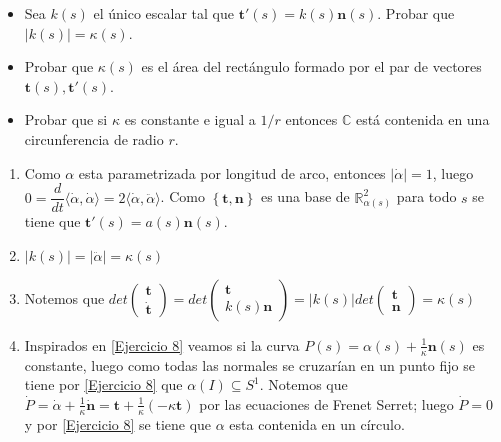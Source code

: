 \documentclass[11pt]{article}
\newcommand{\C}{\mathbb{C}}
\newcommand{\R}{{\mathbb{R}}}
\newcommand\abs[1]{\left\lvert#1\right\rvert}
\renewcommand\tt{\mathbf{t}}
\newcommand\nn{\mathbf{n}}
\newcommand{\sett}[1]{\left\lbrace#1\right\rbrace}
\newenvironment{proof}[1][Demostraci\'on]{\begin{trivlist}
		\item[\hskip \labelsep {\bfseries #1}]}{\end{trivlist}}
\newcommand{\qed}{\nobreak \ifvmode \relax \else
	\ifdim\lastskip<1.5em \hskip-\lastskip
	\hskip1.5em plus0em minus0.5em \fi \nobreak
	\vrule height0.75em width0.5em depth0.25em\fi}
\begin{document}
\begin{enumerate}
\begin{itemize}
		\item Sea $k(s)$ el \'unico escalar tal que $\tt'(s) = k(s) \nn(s)$. Probar que
		$|k(s)| = \kappa(s)$.
		
		\item Probar que $\kappa(s)$ es el \'area del rect\'angulo formado por el par de vectores
		$\tt(s), \tt'(s)$.
		
		\item Probar que si $\kappa$ es constante e igual a $1/r$ entonces $\C$ est\'a contenida
		en una circunferencia de radio $r$.
	\end{itemize}
	
	\label{Ejercicio 9}
	
	\begin{proof}
		\begin{enumerate}
			
			\item Como $\alpha$ esta parametrizada por longitud de arco, entonces $\abs{\dot{\alpha}} = 1$, luego $0 =  \dfrac{d}{dt} \langle \dot{\alpha} , \dot{\alpha} \rangle = 2 \langle \dot{\alpha} , \ddot{\alpha} \rangle$. Como $\sett{\tt , \nn}$ es una base de $\R^2_{\alpha(s)}$ para todo $s$ se tiene que $\tt'(s) = a(s) \nn(s)$.
			
			\item $\abs{k(s)} = \abs{\ddot{\alpha}} = \kappa(s)$
			
			\item Notemos que $det \left( 
			\begin{array}{c}
			\tt	\\ 
			\dot{\tt}
			\end{array} 
			\right) = det \left( 
			\begin{array}{c}
			\tt	\\ 
			k(s) \nn
			\end{array} 
			\right) = \abs{k(s)}det \left( 
			\begin{array}{c}
			\tt	\\ 
			\nn
			\end{array} 
			\right) = \kappa(s)$
			
			\item Inspirados en \ref{Ejercicio 8} veamos si la curva $P(s) = \alpha(s) + \frac{1}{\kappa}\nn(s)$ es constante, luego como todas las normales se cruzar\'ian en un punto fijo se tiene por \ref{Ejercicio 8} que $\alpha(I) \subseteq S^1 $. Notemos que $\dot{P} = \dot{\alpha} + \frac{1}{\kappa} \dot{\nn} = \tt + \frac{1}{\kappa} (-\kappa \tt)$ por las ecuaciones de Frenet Serret; luego $\dot{P} = 0$ y por \ref{Ejercicio 8} se tiene que $\alpha$ esta contenida en un  c\'irculo. \qed
			

\end{enumerate}
\end{proof}
\end{enumerate}
\end{document}
